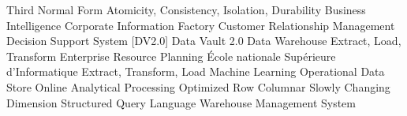 
\begin{acronym}[DV2.0]
                {Third Normal Form}
               {Atomicity, Consistency, Isolation, Durability}
                 {Business Intelligence}
                {Corporate Information Factory}
                {Customer Relationship Management}
                {Decision Support System}
    [DV2.0]  {Data Vault 2.0}
                 {Data Warehouse}
                {Extract, Load, Transform}
                {Enterprise Resource Planning}
                {École nationale Supérieure d'Informatique}
                {Extract, Transform, Load}
                 {Machine Learning}
                {Operational Data Store}
               {Online Analytical Processing}
                {Optimized Row Columnar}
                {Slowly Changing Dimension}
                {Structured Query Language}
                {Warehouse Management System}
\end{acronym}
